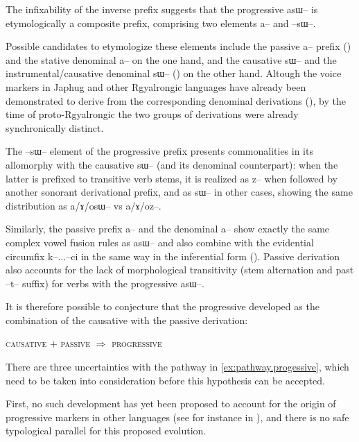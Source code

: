 \documentclass[oldfontcommands,oneside,a4paper,11pt]{article}
\newcommand{\ipa}[1]{{\phon \mbox{#1}}} %
\begin{document}
The infixability of the inverse prefix suggests that the progressive \ipa{asɯ--} is etymologically a composite prefix, comprising two elements \ipa{a--} and \ipa{--sɯ--}. 

Possible candidates to etymologize these elements include the passive \ipa{a--} prefix (\citealt{jacques07passif}) and the stative denominal \ipa{a--} on the one hand, and the causative \ipa{sɯ--} and the instrumental/causative denominal \ipa{sɯ--} (\citealt{jacques15causative}) on the other hand. Altough the voice markers in Japhug and other Rgyalrongic languages have already been demonstrated to derive from the corresponding denominal derivations (\citealt{jacques14antipassive, lai14caus, jacques15causative}), by the time of proto-Rgyalrongic the two groups of derivations were already synchronically distinct.

The \ipa{--sɯ--} element of the progressive prefix presents commonalities in its allomorphy with the causative \ipa{sɯ--} (and its denominal counterpart): when the latter is prefixed to transitive verb stems, it is realized as \ipa{z--} when followed by another sonorant derivational prefix, and as \ipa{sɯ--} in other cases, showing the same distribution as \ipa{a/ɤ/osɯ--} vs \ipa{a/ɤ/oz--}.

Similarly, the passive prefix \ipa{a--} and the denominal \ipa{a--} show exactly the same complex vowel fusion rules as \ipa{asɯ--} and also combine with the evidential circumfix \ipa{k--...--ci} in the same way in the inferential form (\citealt{jacques07passif}). Passive derivation also accounts for the lack of morphological transitivity (stem alternation and past \ipa{--t--} suffix) for verbs with the progressive \ipa{asɯ--}.

It is therefore possible to conjecture that the progressive developed as the combination of the causative with the passive derivation:

\begin{exe}
\ex \label{ex:pathway.progessive}
\glt \textsc{causative} + \textsc{passive} $\Rightarrow$ \textsc{progressive}
\end{exe}

There are three uncertainties with the pathway in \ref{ex:pathway.progessive}, which need to be taken into consideration before this hypothesis can be accepted.

First, no such development has yet been proposed to account for the origin of progressive markers in other languages (see for instance in \citealt{bybee94TAM, heine-kuteva02}), and there is no safe typological parallel for this proposed evolution.
\end{document}
